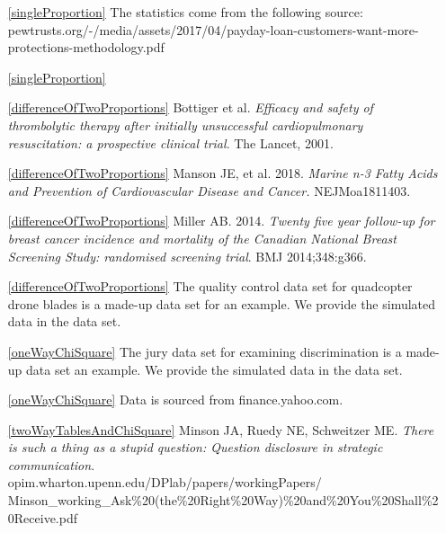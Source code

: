\begin{itemize}
\setlength{\itemsep}{0mm}
\item[\ref{singleProportion}]
    The statistics come from the following source: \\
    {\footnotesize{}
        {pewtrusts.org/-/media/assets/2017/04/payday-loan-customers-want-more-protections-methodology.pdf}}
\item[\ref{singleProportion}]
    \madeup{}

\item[\ref{differenceOfTwoProportions}]
    B$\ddot{\text{o}}$ttiger et al.
    \emph{Efficacy and safety of thrombolytic therapy after
        initially unsuccessful cardiopulmonary resuscitation:
        a prospective clinical trial}.
        The Lancet, 2001.
\item[\ref{differenceOfTwoProportions}]
    Manson JE, et al. 2018.
    \emph{Marine n-3 Fatty Acids and Prevention of
    Cardiovascular Disease and Cancer.}
    NEJMoa1811403.
\item[\ref{differenceOfTwoProportions}]
        {Miller AB. 2014.
            \emph{Twenty five year follow-up for breast cancer
            incidence and mortality of the Canadian National
            Breast Screening Study: randomised screening trial}.
            BMJ 2014;348:g366.}
\item[\ref{differenceOfTwoProportions}]
    The quality control data set for quadcopter drone blades
    is a made-up data set for an example.
    We provide the simulated data in the
     data set.

\item[\ref{oneWayChiSquare}]
    The jury data set for examining discrimination
    is a made-up data set an example.
    We provide the simulated data in the  data set.
\item[\ref{oneWayChiSquare}]
    Data is sourced from
        {finance.yahoo.com}.

\item[\ref{twoWayTablesAndChiSquare}]
    Minson JA, Ruedy NE, Schweitzer ME.
    \emph{There is such a thing as a stupid question:
    Question disclosure in strategic communication}. \\
    {\small{}
        {opim.wharton.upenn.edu/DPlab/papers/workingPapers/}}\\
    {\small{}
        {Minson\_working\_Ask\%20(the\%20Right\%20Way)\%20and\%20You\%20Shall\%20Receive.pdf}}


\end{itemize}
